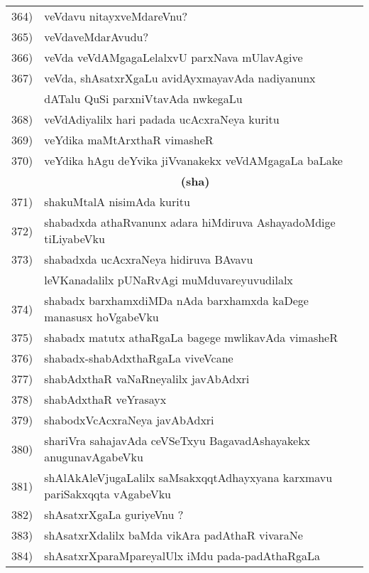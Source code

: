 {\begin{longtable}{@{}cp{7.4cm}r}
364) & veVdavu nitayxveMdareVnu? & \pageref{page133}\\
365) & veVdaveMdarAvudu? & \pageref{page132}\\
366) & veVda veVdAMgagaLelalxvU parxNava mUlavAgive & \pageref{page165}\\
367) & veVda, shAsatxrXgaLu avidAyxmayavAda nadiyanunx  & \\
     & dATalu QuSi parxniVtavAda nwkegaLu & \pageref{page42}\\
 368) & veVdAdiyalilx hari padada ucAcxraNeya kuritu & \pageref{page149}\\
 369) & veYdika maMtArxthaR vimasheR & \pageref{page111}\\
 370) & veYdika hAgu deYvika jiVvanakekx veVdAMgagaLa baLake & \pageref{page191}\\[0.3cm]
      & \multicolumn{1}{c}{\textbf{(sha)}} & \\[0.3cm]
 371) &  shakuMtalA nisimAda kuritu & \pageref{page234}\\
 372) & shabadxda athaRvanunx adara hiMdiruva AshayadoMdige tiLiyabeVku & \pageref{page179}\\
 373) & shabadxda ucAcxraNeya hidiruva BAvavu & \\
      & leVKanadalilx pUNaRvAgi muMduvareyuvudilalx & \pageref{page181}\\
 374) &  shabadx barxhamxdiMDa nAda barxhamxda kaDege manasusx hoVgabeVku & \pageref{page161}\\
 375) & shabadx matutx athaRgaLa bagege mwlikavAda vimasheR & \pageref{page111}\\
 376) & shabadx-shabAdxthaRgaLa viveVcane  & \pageref{page113}\\
 377) & shabAdxthaR vaNaRneyalilx javAbAdxri  & \pageref{page112}\\
 378) & shabAdxthaR veYrasayx & \pageref{page112}\\
 379) & shabodxVcAcxraNeya javAbAdxri & \pageref{page124}\\
 380) & shariVra sahajavAda ceVSeTxyu BagavadAshayakekx anugunavAgabeVku & \pageref{80}\\
 381) & shAlAkAleVjugaLalilx saMsakxqqtAdhayxyana karxmavu pariSakxqqta vAgabeVku &\pageref{page53}\\
 382) & shAsatxrXgaLa guriyeVnu ? & \pageref{page93}\\
 383) & shAsatxrXdalilx baMda vikAra padAthaR vivaraNe & \pageref{page225}\\
 384) & shAsatxrXparaMpareyalUlx iMdu pada-padAthaRgaLa &  \\

\end{longtable}}
